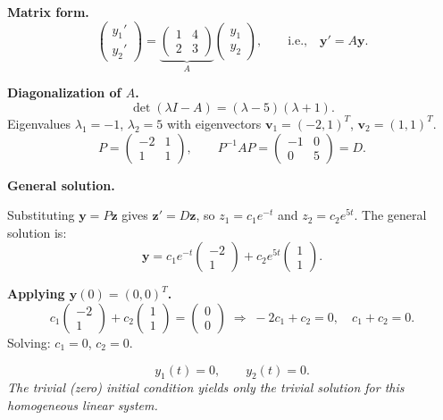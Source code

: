 \documentclass[12pt,a3paper]{article}
\begin{document}
\begin{tcolorbox}[enhanced,breakable,
  colback=cE!4,colframe=cE,boxrule=0.8pt,arc=5pt,
  title={\textbf{Answer --- Matrix ODE: $y_1'=y_1+4y_2$, $y_2'=2y_1+3y_2$,
    $y_1(0)=y_2(0)=0$}},
  fonttitle=\bfseries\color{white},colbacktitle=cE]

\textbf{Matrix form.}
\[
  \begin{pmatrix}y_1'\\y_2'\end{pmatrix}
  =\underbrace{\begin{pmatrix}1&4\\2&3\end{pmatrix}}_{A}
  \begin{pmatrix}y_1\\y_2\end{pmatrix},
  \qquad\text{i.e.,}\quad \mathbf{y}'=A\mathbf{y}.
\]

\textbf{Diagonalization of $A$.}
\[
  \det(\lambda I-A)=(\lambda-5)(\lambda+1).
\]
Eigenvalues $\lambda_1=-1$, $\lambda_2=5$ with eigenvectors
$\mathbf{v}_1=(-2,1)^T$, $\mathbf{v}_2=(1,1)^T$.
\[
  P=\begin{pmatrix}-2&1\\1&1\end{pmatrix},\qquad
  P^{-1}AP=\begin{pmatrix}-1&0\\0&5\end{pmatrix}=D.
\]

\textbf{General solution.}

Substituting $\mathbf{y}=P\mathbf{z}$ gives $\mathbf{z}'=D\mathbf{z}$, so
$z_1=c_1 e^{-t}$ and $z_2=c_2 e^{5t}$.
The general solution is:
\[
  \mathbf{y}=c_1 e^{-t}\begin{pmatrix}-2\\1\end{pmatrix}
            +c_2 e^{5t}\begin{pmatrix}1\\1\end{pmatrix}.
\]

\textbf{Applying $\mathbf{y}(0)=(0,0)^T$.}
\[
  c_1\begin{pmatrix}-2\\1\end{pmatrix}+c_2\begin{pmatrix}1\\1\end{pmatrix}
  =\begin{pmatrix}0\\0\end{pmatrix}
  \;\Longrightarrow\;
  -2c_1+c_2=0,\quad c_1+c_2=0.
\]
Solving: $c_1=0$, $c_2=0$.

\[
  \boxed{y_1(t)=0,\qquad y_2(t)=0.}
\]
\textit{The trivial (zero) initial condition yields only the trivial solution for this
homogeneous linear system.}

\end{tcolorbox}
\end{document}
